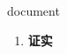 
\begin{frame}
{\huge document}
\begin{center}
\begin{enumerate}\Large
  \item \textbf{证实}
\end{enumerate}
\end{center}
\end{frame}
